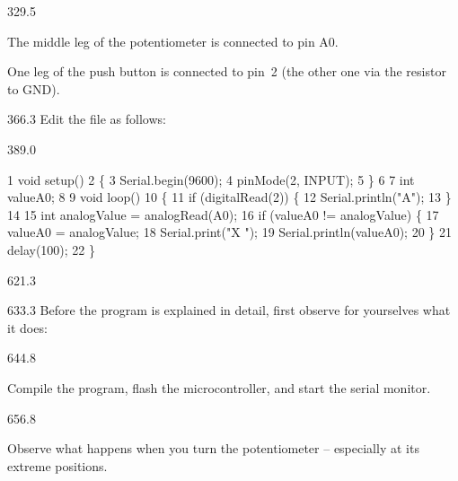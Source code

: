 \documentclass{aslab}
\makeatletter
\newcommand*\aN[1]{\textcolor{codeorange}{#1}}%
\newcommand*\aI[1]{\textcolor{codegreen}{#1}}%
\newcommand*\aK[1]{\textcolor{codered}{#1}}%
\newcommand*\aR[1]{\textcolor{codecyan}{#1}}%
\newenvironment{asmlisting}[1][11]{\par
  \edef\asm@bs{\the\baselineskip}\fontsize{#1bp}{\asm@bs}\selectfont
  \ttfamily\asm@setup}{\par}
\makeatother
\begin{document}
\begin{region}{329.5}
\begin{dashlist}
\item The middle leg of the potentiometer is connected to pin A0.
\item One leg of the push button is connected to pin~2 (the other one via
  the resistor to GND).
\end{dashlist}
\end{region}

\begin{region}{366.3}
Edit the file  as follows:
\end{region}

\begin{region}[pitch=10]{389.0}
\begin{asmlisting}[9]
  \aN{1} \aI{void} \aR{setup}()
  \aN{2} \{
  \aN{3}     \aR{Serial}.\aR{begin}(\aK{9600});
  \aN{4}     \aR{pinMode}(\aK{2}, \aK{INPUT});
  \aN{5} \}
  \aN{6}
  \aN{7} \aI{int} valueA0;
  \aN{8}
  \aN{9} \aI{void} \aR{loop}()
 \aN{10} \{
 \aN{11}     \aN{if} (\aR{digitalRead}(\aK{2})) \{
 \aN{12}         \aR{Serial}.\aR{println}(\aK{"A"});
 \aN{13}     \}
 \aN{14}
 \aN{15}     \aI{int} analogValue = \aR{analogRead}(A0);
 \aN{16}     \aN{if} (valueA0 != analogValue) \{
 \aN{17}         valueA0 = analogValue;
 \aN{18}         \aR{Serial}.\aR{print}(\aK{"X "});
 \aN{19}         \aR{Serial}.\aR{println}(valueA0);
 \aN{20}     \}
 \aN{21}     \aR{delay}(\aK{100});
 \aN{22} \}
\end{asmlisting}
\end{region}

\begin{region}{621.3}
\end{region}

\begin{region}{633.3}
Before the program is explained in detail, first observe for yourselves what
it does:
\end{region}

\begin{region}{644.8}
\begin{dashlist}
\item Compile the program, flash the microcontroller, and start the serial
  monitor.
\end{dashlist}
\end{region}

\begin{region}[pitch=12.5]{656.8}
\begin{dashlist}
\item Observe what happens when you turn the potentiometer -- especially at
  its extreme positions.
\end{dashlist}
\end{region}
\end{document}
